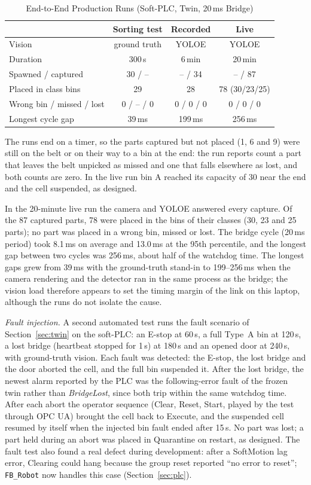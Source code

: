 \begin{table}[t]
\caption{End-to-End Production Runs (Soft-PLC, Twin, 20\,ms Bridge)}
\label{tab:e2e}
\centering
\footnotesize
\setlength{\tabcolsep}{2.5pt}
\begin{tabular}{@{}lccc@{}}
\toprule
 & Sorting test & Recorded & Live \\
\midrule
Vision & ground truth & YOLOE & YOLOE \\
Duration & 300\,s & 6\,min & 20\,min \\
Spawned / captured & 30 / -- & -- / 34 & -- / 87 \\
Placed in class bins & 29 & 28 & 78 (30/23/25) \\
Wrong bin / missed / lost & 0 / -- / 0 & 0 / 0 / 0 & 0 / 0 / 0 \\
Longest cycle gap & 39\,ms & 199\,ms & 256\,ms \\
\bottomrule
\end{tabular}
\end{table}
The runs end on a timer, so the parts captured but not placed (1, 6 and 9) were still on the
belt or on their way to a bin at the end: the run reports count a part that leaves the belt
unpicked as missed and one that falls elsewhere as lost, and both counts are zero. In the live run
bin A reached its capacity of 30 near the end and the cell suspended, as designed.

In the 20-minute live run the camera and YOLOE answered every capture. Of the 87 captured
parts, 78 were placed in the bins of their classes (30, 23 and 25 parts); no part was placed in a
wrong bin, missed or lost. The bridge cycle (20\,ms period) took 8.1\,ms on average and 13.0\,ms
at the 95th percentile, and the longest gap between two cycles was 256\,ms, about half of the
watchdog time. The longest gaps grew from 39\,ms with the ground-truth stand-in to
199--256\,ms when the camera rendering and the detector ran in the same process as the bridge;
the vision load therefore appears to set the timing margin of the link on this laptop, although
the runs do not isolate the cause.

\emph{Fault injection.} A second automated test runs the fault scenario of
Section~\ref{sec:twin} on the soft-PLC: an E-stop at 60\,s, a full Type~A bin at 120\,s, a lost
bridge (heartbeat stopped for 1\,s) at 180\,s and an opened door at 240\,s, with ground-truth
vision. Each fault was detected: the E-stop, the lost bridge and the door aborted the cell, and
the full bin suspended it. After the lost bridge, the newest alarm reported by the PLC was the
following-error fault of the frozen twin rather than \emph{BridgeLost}, since both trip within
the same watchdog time. After each abort the operator sequence (Clear, Reset, Start, played by
the test through OPC UA) brought the cell back to Execute, and the suspended cell resumed by
itself when the injected bin fault ended after 15\,s. No part was lost; a part held during an abort was
placed in Quarantine on restart, as designed. The fault test also found a real defect during
development: after a SoftMotion lag error, Clearing could hang because the group reset reported
``no error to reset''; \texttt{FB\_Robot} now handles this case (Section~\ref{sec:plc}).

